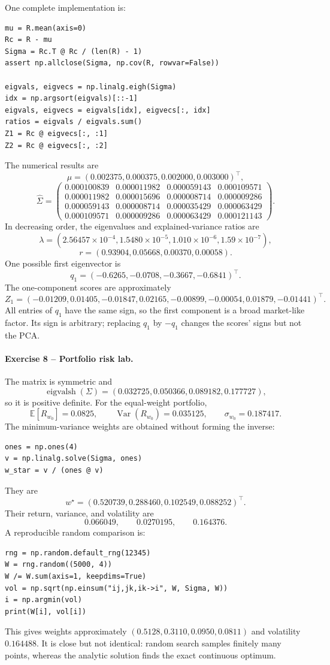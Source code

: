 \documentclass[10pt]{article}
\newcommand{\E}{\mathbb{E}}
\newcommand{\Var}{\operatorname{Var}}
\begin{document}
One complete implementation is:
\begin{verbatim}
mu = R.mean(axis=0)
Rc = R - mu
Sigma = Rc.T @ Rc / (len(R) - 1)
assert np.allclose(Sigma, np.cov(R, rowvar=False))

eigvals, eigvecs = np.linalg.eigh(Sigma)
idx = np.argsort(eigvals)[::-1]
eigvals, eigvecs = eigvals[idx], eigvecs[:, idx]
ratios = eigvals / eigvals.sum()
Z1 = Rc @ eigvecs[:, :1]
Z2 = Rc @ eigvecs[:, :2]
\end{verbatim}
The numerical results are
\[
\mu=(0.002375,0.000375,0.002000,0.003000)^\top,
\]
\[
\widehat\Sigma=\begin{pmatrix}
0.000100839&0.000011982&0.000059143&0.000109571\\
0.000011982&0.000015696&0.000008714&0.000009286\\
0.000059143&0.000008714&0.000035429&0.000063429\\
0.000109571&0.000009286&0.000063429&0.000121143
\end{pmatrix}.
\]
In decreasing order, the eigenvalues and explained-variance ratios are
\[
\lambda=(2.56457\!\times10^{-4},1.5480\!\times10^{-5},
1.010\!\times10^{-6},1.59\!\times10^{-7}),
\]
\[
r=(0.93904,0.05668,0.00370,0.00058).
\]
One possible first eigenvector is
\[
q_1=(-0.6265,-0.0708,-0.3667,-0.6841)^\top.
\]
The one-component scores are approximately
\[
Z_1=(-0.01209,0.01405,-0.01847,0.02165,-0.00899,-0.00054,
0.01879,-0.01441)^\top.
\]
All entries of $q_1$ have the same sign, so the first component is a broad
market-like factor. Its sign is arbitrary; replacing $q_1$ by $-q_1$ changes
the scores' signs but not the PCA.

\paragraph{Exercise 8 -- Portfolio risk lab.}

The matrix is symmetric and
\[
\operatorname{eigvalsh}(\Sigma)
=(0.032725,0.050366,0.089182,0.177727),
\]
so it is positive definite. For the equal-weight portfolio,
\[
\E[R_{w_0}]=0.0825,\qquad
\Var(R_{w_0})=0.035125,\qquad
\sigma_{w_0}=0.187417.
\]
The minimum-variance weights are obtained without forming the inverse:
\begin{verbatim}
ones = np.ones(4)
v = np.linalg.solve(Sigma, ones)
w_star = v / (ones @ v)
\end{verbatim}
They are
\[
w^\star=(0.520739,0.288460,0.102549,0.088252)^\top.
\]
Their return, variance, and volatility are
\[
0.066049,\qquad 0.0270195,\qquad 0.164376.
\]
A reproducible random comparison is:
\begin{verbatim}
rng = np.random.default_rng(12345)
W = rng.random((5000, 4))
W /= W.sum(axis=1, keepdims=True)
vol = np.sqrt(np.einsum("ij,jk,ik->i", W, Sigma, W))
i = np.argmin(vol)
print(W[i], vol[i])
\end{verbatim}
This gives weights approximately $(0.5128,0.3110,0.0950,0.0811)$ and volatility
$0.164488$. It is close but not identical: random search samples finitely many
points, whereas the analytic solution finds the exact continuous optimum.
\end{document}

